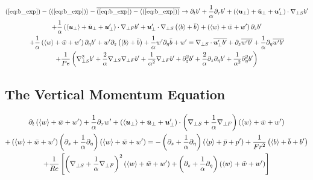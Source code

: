 \documentclass{article}
\begin{document}
\begin{multline}
    (\ref{eq:b_exp}) - \left<(\ref{eq:b_exp})\right> - \overline{(\ref{eq:b_exp}) -
    \left<(\ref{eq:b_exp})\right>} \to \partial_t b' +
    \frac{1}{\alpha}\partial_{\tau} b' + \left(\left<\boldsymbol{u}_{\perp}\right> +
    \bar{\boldsymbol{u}}_{\perp} + \boldsymbol{u}_{\perp}'\right)\cdot\nabla_{\perp S} b' 
    \\
    +\frac{1}{\alpha}\left(\left<\boldsymbol{u}_{\perp}\right> +
    \bar{\boldsymbol{u}}_{\perp} + \boldsymbol{u}_{\perp}'\right)\cdot\nabla_{\perp F} b'
    + \boldsymbol{u}_{\perp}'\cdot\nabla_{\perp S}\left(\left<b\right> + \bar{b}\right)
    + \left(\left<w\right> + \bar{w} + w'\right)\partial_zb' 
    \\
    + \frac{1}{\alpha}\left(\left<w\right> + \bar{w} + w'\right)\partial_{\eta}b'  +  w'\partial_z\left(\left<b\right> +
    \bar{b}\right) + \frac{1}{\alpha}w'\partial_{\eta}\bar{b}
    +w' = \nabla_{\perp S}\cdot\overline{\boldsymbol{u}_{\perp}'b'} +
    \partial_z\overline{w'b'} + \frac{1}{\alpha}\partial_{\eta}\overline{w'b'}
    \\
    + \frac{1}{Pe}\left(\nabla_{\perp S}^2b' + \frac{2}{\alpha}\nabla_{\perp S}\nabla_{\perp F} b' +
    \frac{1}{\alpha^2}\nabla_{\perp F} b' + \partial_z^2b' +
    \frac{2}{\alpha}\partial_z\partial_{\eta}b' +
    \frac{1}{\alpha^2}\partial_{\eta}^2b'\right)
    \label{eq:b_pert_eq}
\end{multline}

\subsection{The Vertical Momentum Equation}

\begin{multline}
    \partial_t\left(\left<w\right> + \bar{w} + w'\right) +
    \frac{1}{\alpha}\partial_{\tau}w' + \left(\left<\boldsymbol{u}_{\perp}\right> + \bar{\boldsymbol{u}}_{\perp} + \boldsymbol{u}'_{\perp}\right)\cdot\left(\nabla_{\perp S} +
    \frac{1}{\alpha}\nabla_{\perp F}\right)\left(\left<w\right> + \bar{w} + w'\right) \\+ \left(\left<w\right> + \bar{w} + w'\right)\left(\partial_z +
    \frac{1}{\alpha}\partial_{\eta}\right)\left(\left<w\right> + \bar{w} + w'\right)  \label{eq:w_exp}
     = -\left(\partial_z + \frac{1}{\alpha}\partial_{\eta}\right)\left(\left<p\right> + \bar{p} + p'\right) +
     \frac{1}{Fr^2}\left(\left<b\right> + \bar{b} + b'\right) 
     \\
    + \frac{1}{Re}\left[\left(\nabla_{\perp S} + \frac{1}{\alpha}\nabla_{\perp F}\right)^2
    \left(\left<w\right> + \bar{w} + w'\right) + \left(\partial_z +\frac{1}{\alpha}\partial_{\eta}\right)\left(\left<w\right> + \bar{w} + w'\right)\right]
\end{multline}
\end{document}

